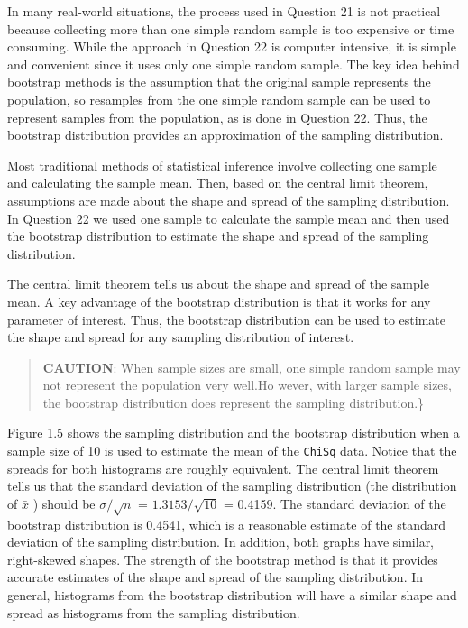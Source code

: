 \documentclass[
]{report}
\begin{document}
In many real-world situations, the process used in Question 21 is not practical because collecting more than one simple random sample is too expensive or time consuming. While the approach in Question 22 is computer intensive, it is simple and convenient since it uses only one simple random sample. The key idea behind bootstrap methods is the assumption that the original sample represents the population, so resamples from the one simple random sample can be used to represent samples from the population, as is done in Question 22. Thus, the bootstrap distribution provides an approximation of the sampling distribution.

Most traditional methods of statistical inference involve collecting one sample and calculating the sample mean. Then, based on the central limit theorem, assumptions are made about the shape and spread of the sampling distribution. In Question 22 we used one sample to calculate the sample mean and then used the bootstrap distribution to estimate the shape and spread of the sampling distribution.

The central limit theorem tells us about the shape and spread of the sample mean. A key advantage of the bootstrap distribution is that it works for any parameter of interest. Thus, the bootstrap distribution can be used to estimate the shape and spread for any sampling distribution of interest.

\begin{quote}
\textbf{CAUTION}: When sample sizes are small, one simple random sample may not represent the population very well.Ho wever, with larger sample sizes, the bootstrap distribution does represent the sampling distribution.\}
\end{quote}

Figure 1.5 shows the sampling distribution and the bootstrap distribution when a sample size of 10 is used to estimate the mean of the \texttt{ChiSq} data. Notice that the spreads for both histograms are roughly equivalent. The central limit theorem tells us that the standard deviation of the sampling distribution (the distribution of \(\scriptstyle \bar{x}\) ) should be \(\scriptstyle \sigma / \sqrt{n}\) = \(\scriptstyle 1.3153/ \sqrt{10}\) = 0.4159. The standard deviation of the bootstrap distribution is 0.4541, which is a reasonable estimate of the standard deviation of the sampling distribution. In addition, both graphs have similar, right-skewed shapes. The strength of the bootstrap method is that it provides accurate estimates of the shape and spread of the sampling distribution. In general, histograms from the bootstrap distribution will have a similar shape and spread as histograms from the sampling distribution.
\end{document}
